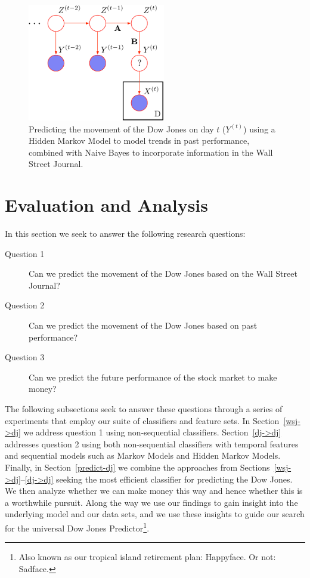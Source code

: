 \documentclass[10pt, twocolumn]{article}
\begin{document}
\begin{figure}
\center
\includegraphics[width=6cm]{figs/hmm-nb-predict.pdf}
\caption{Predicting the movement of the Dow Jones on day $t$ ($Y^{(t)}$) using a Hidden Markov Model to model trends in past performance, combined with Naive Bayes to incorporate information in the Wall Street Journal.}
\label{fig:hmm-nb-predict}
\end{figure}

\section{Evaluation and Analysis}

In this section we seek to answer the following research questions:
\begin{description}
\item[Question 1] Can we predict the movement of the Dow Jones based on the Wall Street Journal?
\item[Question 2] Can we predict the movement of the Dow Jones based on past performance?
\item[Question 3] Can we predict the future performance of the stock market to make money?
\end{description}

The following subsections seek to answer these questions through a series of experiments that employ our suite of classifiers and feature sets.
In Section~\ref{wsj->dj} we address question 1 using non-sequential classifiers.
Section~\ref{dj->dj} addresses question 2 using both non-sequential classifiers with temporal features and sequential models such as Markov Models and Hidden Markov Models.
Finally, in Section~\ref{predict-dj} we combine the approaches from Sections~\ref{wsj->dj}--\ref{dj->dj} seeking the most efficient classifier for predicting the Dow Jones.
We then analyze whether we can make money this way and hence whether this is a worthwhile pursuit. 
Along the way we use our findings to gain insight into the underlying model and our data sets, and we use these insights to guide our search for the universal Dow Jones Predictor\footnote{Also known as our tropical island retirement plan: Happyface. Or not: Sadface.}.
\end{document}
